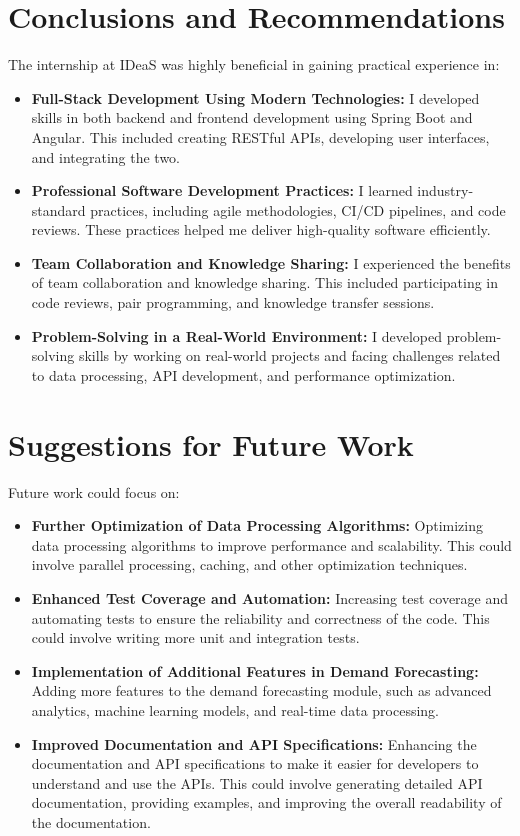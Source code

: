 \documentclass[openany, 11pt]{report} %
\begin{document}
\chapter{Conclusions and Recommendations}
The internship at IDeaS was highly beneficial in gaining practical experience in:
\begin{itemize}
    \item \textbf{Full-Stack Development Using Modern Technologies:} I developed skills in both backend and frontend development using Spring Boot and Angular. This included creating RESTful APIs, developing user interfaces, and integrating the two.
    \item \textbf{Professional Software Development Practices:} I learned industry-standard practices, including agile methodologies, CI/CD pipelines, and code reviews. These practices helped me deliver high-quality software efficiently.
    \item \textbf{Team Collaboration and Knowledge Sharing:} I experienced the benefits of team collaboration and knowledge sharing. This included participating in code reviews, pair programming, and knowledge transfer sessions.
    \item \textbf{Problem-Solving in a Real-World Environment:} I developed problem-solving skills by working on real-world projects and facing challenges related to data processing, API development, and performance optimization.
\end{itemize}

\chapter{Suggestions for Future Work}
Future work could focus on:
\begin{itemize}
    \item \textbf{Further Optimization of Data Processing Algorithms:} Optimizing data processing algorithms to improve performance and scalability. This could involve parallel processing, caching, and other optimization techniques.
    \item \textbf{Enhanced Test Coverage and Automation:} Increasing test coverage and automating tests to ensure the reliability and correctness of the code. This could involve writing more unit and integration tests.
    \item \textbf{Implementation of Additional Features in Demand Forecasting:} Adding more features to the demand forecasting module, such as advanced analytics, machine learning models, and real-time data processing.
    \item \textbf{Improved Documentation and API Specifications:} Enhancing the documentation and API specifications to make it easier for developers to understand and use the APIs. This could involve generating detailed API documentation, providing examples, and improving the overall readability of the documentation.
\end{itemize}
\end{document}
